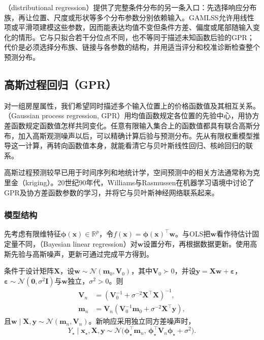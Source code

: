 （distributional regression）提供了完整条件分布的另一条入口：先选择响应分布族，再让位置、尺度或形状等多个分布参数分别依赖输入。GAMLSS允许用线性项或平滑项建模这些参数，因而能表达均值不变但条件方差、偏度或尾部随输入变化的情形。它与只拟合若干分位点不同，也不等同于描述未知函数后验的GPR；代价是必须选择分布族、链接与各参数的结构，并用适当评分和校准诊断检查整个预测分布。

\subsection{高斯过程回归（GPR）}
\label{sec:regression-gpr}

对一组房屋属性，我们希望同时描述多个输入位置上的价格函数值及其相互关系。（Gaussian process regression, GPR）用均值函数规定各位置的先验中心，用协方差函数规定函数值怎样共同变化。任意有限输入集合上的函数值都具有联合高斯分布，加入高斯观测噪声以后，可以精确计算后验与预测分布。先从有限权重模型推导这一计算，再转向函数值本身，就能看清它与贝叶斯线性回归、核岭回归的联系。

高斯过程预测较早已用于时间序列和地统计学，空间预测中的相关方法通常称为克里金（kriging）。20世纪90年代，Williams与Rasmussen在机器学习语境中讨论了GPR及协方差函数参数的学习，并将它与贝叶斯神经网络联系起来。

\subsubsection{模型结构}
\label{sec:regression-gpr-structure}

先考虑有限维特征$\bm{\phi}(\bm{x})\in\mathbb{R}^{p}$，令$f(\bm{x})=\bm{\phi}(\bm{x})^{\top}\bm{w}$。与OLS把$\bm{w}$看作待估计固定量不同，（Bayesian linear regression）对$\bm{w}$设置分布，再根据数据更新。使用高斯先验与高斯噪声，更新可通过完成平方得到。

\begin{theorem}[贝叶斯线性回归的后验与预测]
  \label{thm:regression-bayesian-linear}
  条件于设计矩阵$\bm{X}$，设$\bm{w}\sim\mathcal{N}(\bm{m}_0,\bm{V}_0)$，其中$\bm{V}_0\succ0$，并设$\bm{y}=\bm{X}\bm{w}+\bm{\varepsilon}$，$\bm{\varepsilon}\sim\mathcal{N}(\bm{0},\sigma^2\bm{I})$与$\bm{w}$独立，$\sigma^2>0$。则
  \[
    \begin{aligned}
      \bm{V}_n&=(\bm{V}_0^{-1}+\sigma^{-2}\bm{X}^{\top}\bm{X})^{-1},\\
      \bm{m}_n&=\bm{V}_n
          (\bm{V}_0^{-1}\bm{m}_0+\sigma^{-2}\bm{X}^{\top}\bm{y}),
    \end{aligned}
  \]
  且$\bm{w}\mid\bm{X},\bm{y}\sim\mathcal{N}(\bm{m}_n,\bm{V}_n)$。新响应采用独立同方差噪声时，
  \[
    Y_{\star}\mid\bm{x}_{\star},\bm{X},\bm{y}
    \sim\mathcal{N}\bigl(
      \bm{\phi}_{\star}^{\top}\bm{m}_n,\,
      \bm{\phi}_{\star}^{\top}\bm{V}_n\bm{\phi}_{\star}+\sigma^2\bigr).
  \]
\end{theorem}

